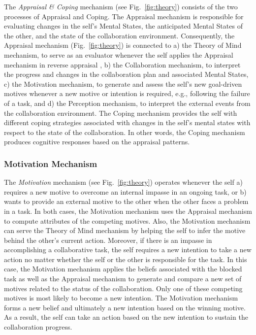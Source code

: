 The \textit{Appraisal \& Coping} mechanism (see Fig.~\ref{fig:theory}) consists
of the two processes of Appraisal and Coping. The Appraisal mechanism is
responsible for evaluating changes in the self's Mental States, the anticipated
Mental States of the other, and the state of the collaboration environment.
Consequently, the Appraisal mechanism (Fig.~\ref{fig:theory}) is connected to a)
the Theory of Mind mechanism, to serve as an evaluator whenever the self applies
the Appraisal mechanism in reverse appraisal \cite{gratch:reverse-appraisal}, b)
the Collaboration mechanism, to interpret the progress and changes in the
collaboration plan and associated Mental States, c) the Motivation mechanism, to
generate and assess the self's new goal-driven motives whenever a new motive or
intention is required, e.g., following the failure of a task, and d) the
Perception mechanism, to interpret the external events from the collaboration
environment. The Coping mechanism provides the self with different coping
strategies associated with changes in the self's mental states with respect to
the state of the collaboration. In other words, the Coping mechanism produces
cognitive responses based on the appraisal patterns.

\subsubsection{Motivation Mechanism}

The \textit{Motivation} mechanism (see Fig.~\ref{fig:theory}) operates whenever
the self a) requires a new motive to overcome an internal impasse in an ongoing
task, or b) wants to provide an external motive to the other when the other
faces a problem in a task. In both cases, the Motivation mechanism uses the
Appraisal mechanism to compute attributes of the competing motives. Also, the
Motivation mechanism can serve the Theory of Mind mechanism by helping the self
to infer the motive behind the other's current action. Moreover, if there is an
impasse in accomplishing a collaborative task, the self requires a new intention
to take a new action no matter whether the self or the other is responsible for
the task. In this case, the Motivation mechanism applies the beliefs associated
with the blocked task as well as the Appraisal mechanism to generate and compare
a new set of motives related to the status of the collaboration. Only one of
these competing motives is most likely to become a new intention. The Motivation
mechanism forms a new belief and ultimately a new intention based on the winning
motive. As a result, the self can take an action based on the new intention to
sustain the collaboration progress.

